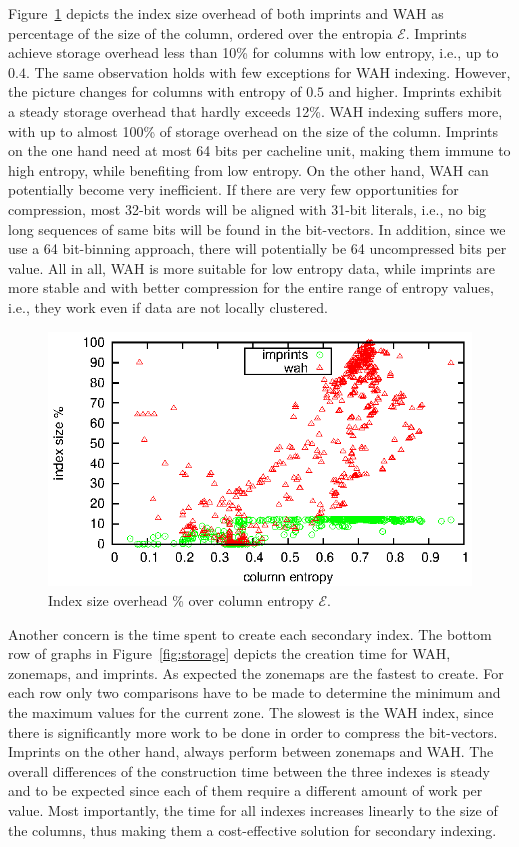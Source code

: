 Figure~\ref{fig:entropy} depicts the index size overhead of both imprints
and WAH as percentage of the size of the column, ordered over the entropia
$\mathcal{E}$. Imprints achieve storage overhead less than 10\% for
columns with low entropy, i.e., up to $0.4$. The same observation holds with
few exceptions for WAH indexing. However, the picture changes for columns with
entropy of $0.5$ and higher. Imprints exhibit a steady storage overhead
that hardly exceeds 12\%. WAH indexing suffers more, with up to almost 100\% of
storage overhead on the size of the column. Imprints on the one hand need
at most 64 bits per cacheline unit, making them immune to high entropy,
while benefiting from low entropy. On the other hand, WAH can potentially
become very inefficient. If there are very few opportunities for compression,
most 32-bit words will be aligned with 31-bit literals, i.e., no big long
sequences of same bits will be found in the bit-vectors. In addition, since we
use a 64 bit-binning approach, there will potentially be 64 uncompressed bits
per value. All in all, WAH is more suitable for low entropy data, while
imprints are more stable and with better compression for the entire range of
entropy values, i.e., they work even if data are not locally clustered.

\begin{figure}
\includegraphics{figs/static/entropy}
\caption{Index size overhead \% over column entropy $\mathcal{E}$.}
\label{fig:entropy}
\end{figure}

Another concern is the time spent to create each secondary index. The bottom
row of graphs in Figure~\ref{fig:storage} depicts the creation time for WAH,
zonemaps, and imprints. As expected the zonemaps are the fastest to create.
For each row only two comparisons have to be made to determine the minimum
and the maximum values for the current zone. The slowest is the WAH index,
since there is significantly more work to be done in order to compress the
bit-vectors. Imprints on the other hand, always perform between zonemaps and
WAH. The overall differences of the construction time between the three indexes
is steady and to be expected since each of them require a different amount of
work per value. Most importantly, the time for all indexes increases linearly
to the size of the columns, thus making them a cost-effective solution for
secondary indexing.

